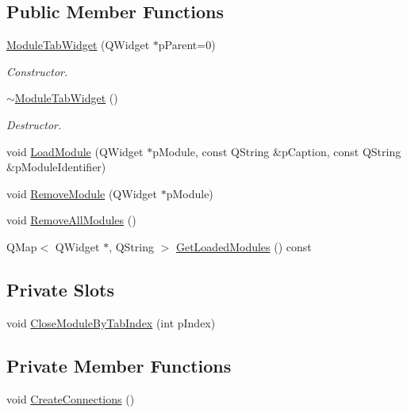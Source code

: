 \subsection*{Public Member Functions}
\begin{DoxyCompactItemize}
\item 
\hyperlink{class_module_tab_widget_a08d241120cb6e02f675d31673624cbfb}{Module\+Tab\+Widget} (Q\+Widget $\ast$p\+Parent=0)
\begin{DoxyCompactList}\small\item\em Constructor. \end{DoxyCompactList}\item 
\hyperlink{class_module_tab_widget_afb98a2ce2e69c291e742ea6581e64151}{$\sim$\+Module\+Tab\+Widget} ()
\begin{DoxyCompactList}\small\item\em Destructor. \end{DoxyCompactList}\item 
void \hyperlink{class_module_tab_widget_a22c865d611a9d407df82406fc08f4688}{Load\+Module} (Q\+Widget $\ast$p\+Module, const Q\+String \&p\+Caption, const Q\+String \&p\+Module\+Identifier)
\item 
void \hyperlink{class_module_tab_widget_a16309c1d7a428569730bab9ddbb44beb}{Remove\+Module} (Q\+Widget $\ast$p\+Module)
\item 
void \hyperlink{class_module_tab_widget_a0ca4cd7a4ac35d161997a5a871190856}{Remove\+All\+Modules} ()
\item 
Q\+Map$<$ Q\+Widget $\ast$, Q\+String $>$ \hyperlink{class_module_tab_widget_ace49eb0fc43795da23941ccde88526da}{Get\+Loaded\+Modules} () const 
\end{DoxyCompactItemize}
\subsection*{Private Slots}
\begin{DoxyCompactItemize}
\item 
void \hyperlink{class_module_tab_widget_a98bab4e28a28fd2d197e4ab157bdb35e}{Close\+Module\+By\+Tab\+Index} (int p\+Index)
\end{DoxyCompactItemize}
\subsection*{Private Member Functions}
\begin{DoxyCompactItemize}
\item 
void \hyperlink{class_module_tab_widget_a719c37c2ecfb83f486c39cfee6289f17}{Create\+Connections} ()
\end{DoxyCompactItemize}
